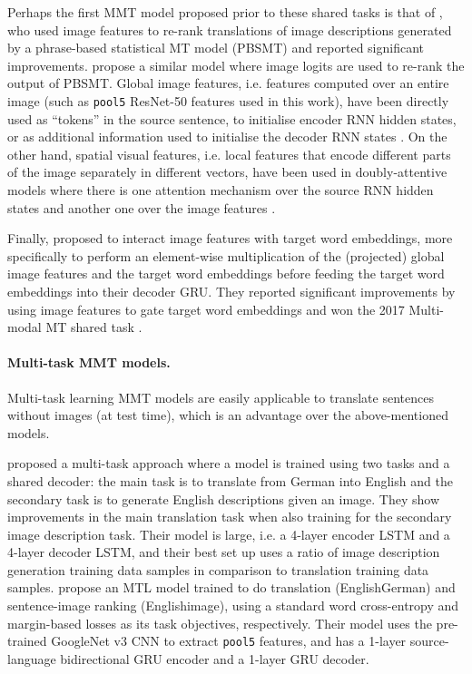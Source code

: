 \documentclass[11pt,a4paper]{article}
\begin{document}
Perhaps the first MMT model proposed prior to these shared tasks is that of , who used image features to re-rank translations of image descriptions generated by a phrase-based statistical MT model (PBSMT) and reported significant improvements.
\citet{Shahetal2016} propose a similar model where image logits are used to re-rank the output of PBSMT.
Global image features, i.e. features computed over an entire image (such as \texttt{pool5} ResNet-50 features used in this work), have been directly used as ``tokens'' in the source sentence, to initialise encoder RNN hidden states, or as additional information used to initialise the decoder RNN states \citep{Huangetal2016,Libovickyetal2016,CalixtoLiu2017}.
On the other hand, spatial visual features, i.e. local features that encode different parts of the image separately in different vectors, have been used in doubly-attentive models where there is one attention mechanism over the source RNN hidden states and another one over the image features \citep{Caglayanetal2016,Calixtoetal2017}.

Finally, \citet{Caglayanetal2017} proposed to interact image features with target word embeddings, more specifically to perform an element-wise multiplication of the (projected) global image features and the target word embeddings before feeding the target word embeddings into their decoder GRU.
They reported significant improvements by using image features to gate target word embeddings and won the 2017 Multi-modal MT shared task \citep{Elliottetal2017}.


\paragraph{Multi-task MMT models.} Multi-task learning MMT models are easily applicable to translate sentences without images (at test time), which is an advantage over the above-mentioned models.

 proposed a multi-task approach where a model is trained using two tasks and a shared decoder: the main task is to translate from German into English and the secondary task is to generate English descriptions given an image.
They show improvements in the main translation task when also training for the secondary image description task.
Their model is large, i.e. a 4-layer encoder LSTM and a 4-layer decoder LSTM, and their best set up uses a ratio of  image description generation training data samples in comparison to translation training data samples.
\citet{ElliottKadar2017} propose an MTL model trained to do translation (EnglishGerman) and sentence-image ranking (Englishimage), using a standard word cross-entropy and margin-based losses as its task objectives, respectively.
Their model uses the pre-trained GoogleNet v3 CNN \citep{Szegedyetal2016} to extract \texttt{pool5} features, and has a 1-layer source-language bidirectional GRU encoder and a 1-layer GRU decoder.
\end{document}
